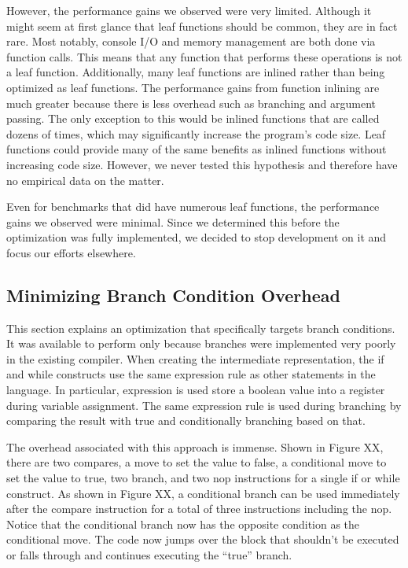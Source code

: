 \documentclass[12pt]{article}
\begin{document}
\begin{multicols}{2}
However, the performance gains we observed were very limited.
Although it might seem at first glance that leaf functions should be common, they are in fact rare.
Most notably, console I/O and memory management are both done via function calls.
This means that any function that performs these operations is not a leaf function.
Additionally, many leaf functions are inlined rather than being optimized as leaf functions.
The performance gains from function inlining are much greater because there is less overhead such as branching and argument passing.
The only exception to this would be inlined functions that are called dozens of times, which may significantly increase the program’s code size.
Leaf functions could provide many of the same benefits as inlined functions without increasing code size.
However, we never tested this hypothesis and therefore have no empirical data on the matter.

Even for benchmarks that did have numerous leaf functions, the performance gains we observed were minimal.
Since we determined this before the optimization was fully implemented, we decided to stop development on it and focus our efforts elsewhere.

\subsection{Minimizing Branch Condition Overhead}
This section explains an optimization that specifically targets branch conditions.
It was available to perform only because branches were implemented very poorly in the existing compiler.
When creating the intermediate representation, the if and while constructs use the same expression rule as other statements in the language.
In particular, expression is used store a boolean value into a register during variable assignment.
The same expression rule is used during branching by comparing the result with true and conditionally branching based on that.

The overhead associated with this approach is immense.
Shown in Figure XX, there are two compares, a move to set the value to false, a conditional move to set the value to true, two branch, and two nop instructions for a single if or while construct.
As shown in Figure XX, a conditional branch can be used immediately after the compare instruction for a total of three instructions including the nop.
Notice that the conditional branch now has the opposite condition as the conditional move.
The code now jumps over the block that shouldn’t be executed or falls through and continues executing the “true” branch.


\end{multicols}
\end{document}
